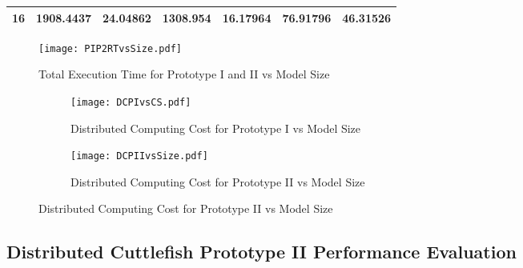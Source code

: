 \begin{table}[]
\begin{tabular}{|l|l|l|l|l|l|l|}
16                                                                                  & 1908.4437                                                                                                                   & 24.04862                                                                                                                                        & 1308.954                                                                                                                                        & 16.17964                                                                                                                                         & 76.91796                                                                                                                                     & 46.31526                                                                                                                                       \\ \hline
\end{tabular}
\end{table}

\begin{figure}[t]
\centering
\texttt{[image: PIP2RTvsSize.pdf]}
\caption{Total Execution Time for Prototype I and II vs Model Size}
\label{fig:PIP2RTvsSize}
\end{figure}

\begin{figure}
\centering
\captionsetup[subfigure]{labelformat=empty}
\begin{subfigure}
\centering
\texttt{[image: DCPIvsCS.pdf]}
\label{fig:DCPIvsCS}
\caption{Distributed Computing Cost for Prototype I vs Model Size}
\end{subfigure}
\begin{subfigure}
\centering
\texttt{[image: DCPIIvsSize.pdf]}
\caption{ Distributed Computing Cost for Prototype II vs Model Size}
\label{fig:DCPIIvsSize}
\end{subfigure}
\end{figure}



\subsection{Distributed Cuttlefish Prototype II Performance Evaluation} \label{ProtoIIDesigns}

